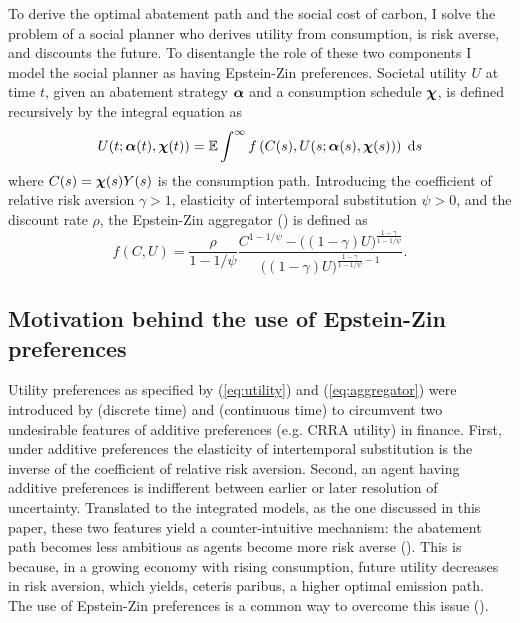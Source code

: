 \documentclass[../../main.tex]{subfiles}
\begin{document}
To derive the optimal abatement path and the social cost of carbon, I solve the problem of a social planner who derives utility from consumption, is risk averse, and discounts the future. To disentangle the role of these two components I model the social planner as having Epstein-Zin preferences. Societal utility $U$ at time $t$, given an abatement strategy $\bm{\alpha}$ and a consumption schedule $\bm{\chi}$, is defined recursively by the integral equation as \begin{equation} \label{eq:utility}
    U(t; \bm{\alpha}(t), \bm{\chi}(t)) = \operatorname{\mathbb{E}} \int^{\infty} f\left(C(s), U(s; \bm{\alpha}(s), \bm{\chi}(s))\right) \; \mathrm{d}s
\end{equation} where $C(s) = \bm{\chi}(s) Y(s)$ is the consumption path. Introducing the coefficient of relative risk aversion $\gamma > 1$, elasticity of intertemporal substitution $\psi > 0$, and the discount rate $\rho$, the Epstein-Zin aggregator (\cite{duffie_asset_1992}) is defined as \begin{equation} \label{eq:aggregator}
    f(C, U) = \frac{\rho}{1 - 1 / \psi} \frac{C^{1 - 1 / \psi} - \big((1- \gamma) U\big)^{\frac{1 - \gamma}{1 - 1 / \psi}}}{\big((1- \gamma) U\big)^{\frac{1 - \gamma}{1 - 1 / \psi} - 1}}.
\end{equation}

\subsection{Motivation behind the use of Epstein-Zin preferences}

Utility preferences as specified by (\ref{eq:utility}) and (\ref{eq:aggregator}) were introduced by  (discrete time) and  (continuous time) to circumvent two undesirable features of additive preferences (e.g. CRRA utility) in finance. First, under additive preferences the elasticity of intertemporal substitution is the inverse of the coefficient of relative risk aversion. Second, an agent having additive preferences is indifferent between earlier or later resolution of uncertainty. Translated to the integrated models, as the one discussed in this paper, these two features yield a counter-intuitive mechanism: the abatement path becomes less ambitious as agents become more risk averse (\cite{pindyck_economic_2013}). This is because, in a growing economy with rising consumption, future utility decreases in risk aversion, which yields, ceteris paribus, a higher optimal emission path. The use of Epstein-Zin preferences is a common way to overcome this issue (\cite{pindyck_economic_2013, crost_optimal_2013, ackerman_epsteinzin_2013, hambel_optimal_2021,  olijslagers_discounting_2019}).
\end{document}
